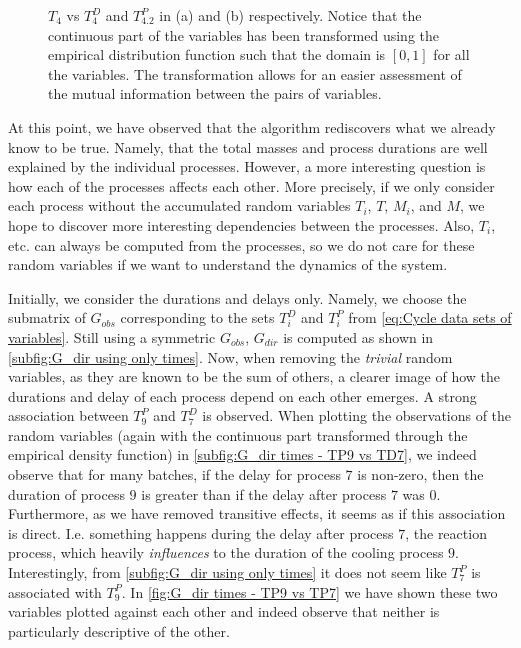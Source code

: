 \documentclass[../Thesis.tex]{subfiles}
\begin{document}
\begin{figure}[H]
\begin{subfigure}[t]{0.49\linewidth}
        \caption{}
    \end{subfigure}
    \caption{$T_4$ vs $T^D_4$ and $T^P_{4.2}$ in (a) and (b) respectively. Notice that the continuous part of the variables has been transformed using the empirical distribution function such that the domain is $[0,1]$ for all the variables. The transformation allows for an easier assessment of the mutual information between the pairs of variables.}
    \label{fig:T4 vs TD4 and TP4.2}
\end{figure}

At this point, we have observed that the algorithm rediscovers what we already know to be true. Namely, that the total masses and process durations are well explained by the individual processes. However, a more interesting question is how each of the processes affects each other. More precisely, if we only consider each process without the accumulated random variables $T_i$, $T$, $M_i$, and $M$, we hope to discover more interesting dependencies between the processes. Also, $T_i$, etc. can always be computed from the processes, so we do not care for these random variables if we want to understand the dynamics of the system.



Initially, we consider the durations and delays only. Namely, we choose the submatrix of $G_{obs}$ corresponding to the sets $T^D_i$ and $T^P_i$ from \autoref{eq:Cycle data sets of variables}. Still using a symmetric $G_{obs}$, $G_{dir}$ is computed as shown in \autoref{subfig:G_dir using only times}. Now, when removing the \textit{trivial} random variables, as they are known to be the sum of others, a clearer image of how the durations and delay of each process depend on each other emerges. A strong association between $T^P_9$ and $T^D_7$ is observed. When plotting the observations of the random variables (again with the continuous part transformed through the empirical density function) in \autoref{subfig:G_dir times - TP9 vs TD7}, we indeed observe that for many batches, if the delay for process $7$ is non-zero, then the duration of process $9$ is greater than if the delay after process $7$ was $0$. Furthermore, as we have removed transitive effects, it seems as if this association is direct. I.e. something happens during the delay after process $7$, the reaction process, which heavily \textit{influences} to the duration of the cooling process $9$. Interestingly, from \autoref{subfig:G_dir using only times} it does not seem like $T^P_7$ is associated with $T^P_9$. In \autoref{fig:G_dir times - TP9 vs TP7} we have shown these two variables plotted against each other and indeed observe that neither is particularly descriptive of the other.
\end{document}

